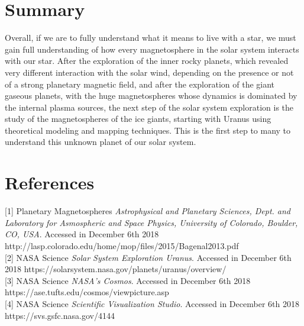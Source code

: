 \documentclass[%
 reprint,
 amsmath,amssymb,
 aps,
]{revtex4-1}
\begin{document}
\section{\label{sec:level4}Summary}

Overall, if we are to fully understand what it means to live with a star, we must gain full understanding of how every magnetosphere in the solar system interacts with our star. After the exploration of the inner rocky planets, which revealed very different interaction with the solar wind, depending on the presence or not of a strong planetary magnetic field, and after the exploration of the giant gaseous planets, with the huge magnetospheres whose dynamics is dominated by the internal plasma sources, the next step of the solar system exploration is the study of the magnetospheres of the ice giants, starting with Uranus using theoretical modeling and mapping techniques. This is the first step to many to understand this unknown planet of our solar system. 

\section{\label{sec:level5}References}

[1] Planetary Magnetospheres \textit{Astrophysical and Planetary Sciences, Dept. and Laboratory for Asmospheric and Space Physics, University of Colorado, Boulder, CO, USA}. Accessed in December 6th 2018 http://lasp.colorado.edu/home/mop/files/2015/Bagenal2013.pdf \\

[2] NASA Science \textit{Solar System Exploration Uranus}. Accessed in December 6th 2018 https://solarsystem.nasa.gov/planets/uranus/overview/ \\

[3] NASA Science \textit{NASA's Cosmos}. Accessed in December 6th 2018 https://ase.tufts.edu/cosmos/viewpicture.asp \\

[4] NASA Science \textit{Scientific Visualization Studio}. Accessed in December 6th 2018 https://svs.gsfc.nasa.gov/4144
\end{document}
